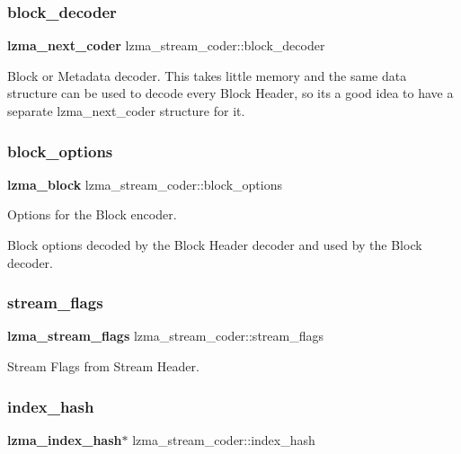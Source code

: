 \subsubsection{block\+\_\+decoder}
{\footnotesize\ttfamily \textbf{ lzma\+\_\+next\+\_\+coder} lzma\+\_\+stream\+\_\+coder\+::block\+\_\+decoder}

Block or Metadata decoder. This takes little memory and the same data structure can be used to decode every Block Header, so it\textquotesingle{}s a good idea to have a separate lzma\+\_\+next\+\_\+coder structure for it. \mbox{\label{structlzma__stream__coder_a4b9136a9e9857066359d675417b0c0b4}} 
\subsubsection{block\+\_\+options}
{\footnotesize\ttfamily \textbf{ lzma\+\_\+block} lzma\+\_\+stream\+\_\+coder\+::block\+\_\+options}



Options for the Block encoder. 

Block options decoded by the Block Header decoder and used by the Block decoder. \mbox{\label{structlzma__stream__coder_a7e071d1ad66d75492dc4418045eb3a63}} 
\subsubsection{stream\+\_\+flags}
{\footnotesize\ttfamily \textbf{ lzma\+\_\+stream\+\_\+flags} lzma\+\_\+stream\+\_\+coder\+::stream\+\_\+flags}



Stream Flags from Stream Header. 

\mbox{\label{structlzma__stream__coder_a0e1147af198db6d94c1a16cf4f150699}} 
\subsubsection{index\+\_\+hash}
{\footnotesize\ttfamily \textbf{ lzma\+\_\+index\+\_\+hash}$\ast$ lzma\+\_\+stream\+\_\+coder\+::index\+\_\+hash}

